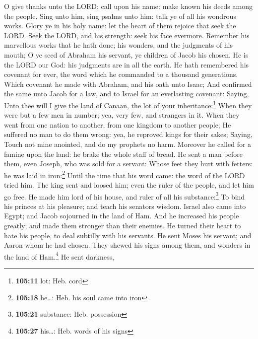  O give thanks unto the LORD; call upon his name: make
known his deeds among the people.  Sing unto him, sing
psalms unto him: talk ye of all his wondrous works.  Glory
ye in his holy name: let the heart of them rejoice that seek the LORD.
 Seek the LORD, and his strength: seek his face evermore.
 Remember his marvellous works that he hath done; his
wonders, and the judgments of his mouth;  O ye seed of
Abraham his servant, ye children of Jacob his chosen.  He
is the LORD our God: his judgments are in all the earth. 
He hath remembered his covenant for ever, the word which he commanded to
a thousand generations.  Which covenant he made with
Abraham, and his oath unto Isaac;  And confirmed the same
unto Jacob for a law, and to Israel for an everlasting covenant:
 Saying, Unto thee will I give the land of Canaan, the
lot of your inheritance:\footnote{\textbf{105:11} lot: Heb. cord}
 When they were but a few men in number; yea, very few,
and strangers in it.  When they went from one nation to
another, from one kingdom to another people;  He suffered
no man to do them wrong: yea, he reproved kings for their sakes;
 Saying, Touch not mine anointed, and do my prophets no
harm.  Moreover he called for a famine upon the land: he
brake the whole staff of bread.  He sent a man before
them, even Joseph, who was sold for a servant:  Whose
feet they hurt with fetters: he was laid in iron:\footnote{\textbf{105:18}
  he\ldots: Heb. his soul came into iron}  Until the time
that his word came: the word of the LORD tried him.  The
king sent and loosed him; even the ruler of the people, and let him go
free.  He made him lord of his house, and ruler of all
his substance:\footnote{\textbf{105:21} substance: Heb. possession}
 To bind his princes at his pleasure; and teach his
senators wisdom.  Israel also came into Egypt; and Jacob
sojourned in the land of Ham.  And he increased his
people greatly; and made them stronger than their enemies.
 He turned their heart to hate his people, to deal
subtilly with his servants.  He sent Moses his servant;
and Aaron whom he had chosen.  They shewed his signs
among them, and wonders in the land of Ham.\footnote{\textbf{105:27}
  his\ldots: Heb. words of his signs}  He sent darkness,

